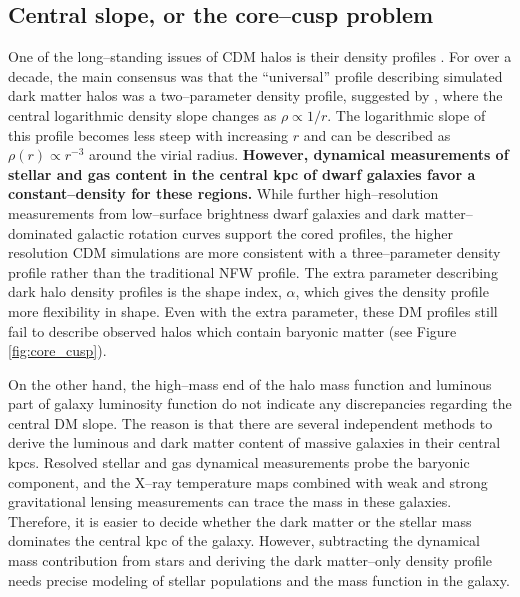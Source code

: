 \documentclass[a4wide,12pt]{book}
\newcommand{\ignore}[1]{}
\begin{document}
\subsection{Central slope, or the core--cusp problem}
\label{subsec:core-cusp}
One of the long--standing issues of CDM halos is their density profiles \citep[][]{Dubinski.Carlberg1991, Walker.Penarrubia2011}. For over a decade, the main consensus was that the ``universal'' profile describing simulated dark matter halos was a two--parameter density profile, suggested by \citet[][ hereafter NFW]{NFW}, where the central logarithmic density slope changes as $\rho \propto 1/r$. The logarithmic slope of this profile becomes less steep with increasing $r$ and can be described as $\rho(r) \propto r^{-3}$ around the virial radius. {\bf However, dynamical measurements of stellar and gas content in the central kpc of dwarf galaxies \citep[][]{Oh+2011} favor a constant--density for these regions.} While further high--resolution measurements from low--surface brightness dwarf galaxies and dark matter--dominated galactic rotation curves support the cored profiles, the higher resolution CDM simulations are more consistent with a three--parameter density profile rather than the traditional NFW profile. The extra parameter describing dark halo density profiles is the shape index, $\alpha$, which gives the density profile more flexibility in shape. Even with the extra parameter, these DM profiles still fail to describe observed halos which contain baryonic matter (see Figure \ref{fig:core_cusp}).

On the other hand, the high--mass end of the halo mass function and luminous part of galaxy luminosity function do not indicate any discrepancies regarding the central DM slope. The reason is that there are several independent methods to derive the luminous and dark matter content of massive galaxies in their central kpcs. Resolved stellar and gas dynamical measurements probe the baryonic component\ignore{ \citep[][]{}}, and the X--ray temperature maps combined with weak and strong gravitational lensing measurements can trace the mass in these galaxies\ignore{ \citep[][]{}}. Therefore, it is easier to decide whether the dark matter or the stellar mass dominates the central kpc of the galaxy. 
 However, subtracting the dynamical mass contribution from stars and deriving the dark matter--only density profile needs precise modeling of stellar populations and the mass function in the galaxy. 
\end{document}
